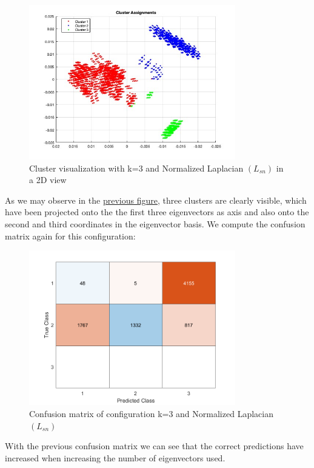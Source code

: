 \documentclass[12pt]{article}
\begin{document}
\begin{figure}[H]
	\centering
	\includegraphics[width=9cm]{2DNormalizedLaplaciank3.jpeg}
	\caption{Cluster visualization with k=3 and Normalized Laplacian $(L_{sn})$ in a 2D view}
	\label{fig:2DnormLapl3clusters}
\end{figure}
As we may observe in the \href{fig:3DnormLapl3clusters}{previous figure}, three clusters are clearly visible, which have been projected onto the the first three eigenvectors as axis and also onto the second and third coordinates in the eigenvector basis.
We compute the confusion matrix again for this configuration:
\smallskip
\begin{figure}[H]
	\centering
	\includegraphics[width=9cm]{confusionk3.png}
	\caption{Confusion matrix of configuration k=3 and Normalized Laplacian $(L_{sn})$}
	\label{fig:confusionk3NormLaplacian}
\end{figure}
\smallskip
\justifying
With the previous confusion matrix we can see that the correct predictions have increased when increasing the number of eigenvectors used.

\end{document}
